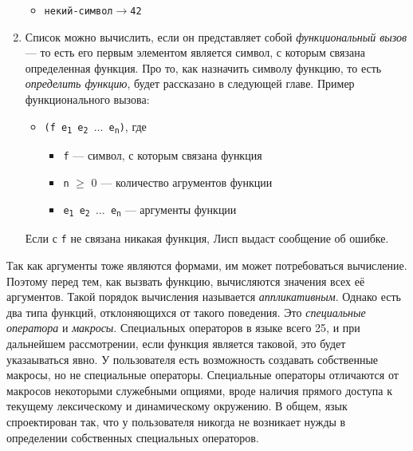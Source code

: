 \documentclass[a4paper, 12pt, titlepage, twoside]{article}
\begin{document}
\begin{enumerate}
\begin{itemize}
  \item[] \begin{alltt} некий-символ \(\longrightarrow\) 42\end{alltt}
  \end{itemize}
\item Список можно вычислить, если он представляет собой \textit{функциональный вызов} --- то есть его первым элементом является символ, с которым связана определенная функция. Про то, как назначить символу функцию, то есть \textit{определить функцию}, будет рассказано в следующей главе. Пример функционального вызова:
  \begin{itemize}
  \item[] \texttt{(f e\textsubscript{1} e\textsubscript{2} $\ldots$ e\textsubscript{n})}, где
    \begin{itemize}
    \item[] \verb|f| --- символ, с которым связана функция
    \item[] \verb|n| $\ge$ 0 --- количество агрументов функции
    \item[] \texttt{e\textsubscript{1} e\textsubscript{2} $\ldots$ e\textsubscript{n}} --- аргументы функции
    \end{itemize}
  \end{itemize}
  Если с \texttt{f} не связана никакая функция, Лисп выдаст сообщение об ошибке.
\end{enumerate}
Так как аргументы тоже являются формами, им может потребоваться вычисление. Поэтому перед тем, как вызвать функцию, вычисляются значения всех её аргументов. Такой порядок вычисления называется \textit{аппликативным}. Однако есть два типа функций, отклоняющихся от такого поведения. Это \textit{специальные оператора} и \textit{макросы}. Специальных операторов в языке всего 25, и при дальнейшем рассмотрении, если функция является таковой, это будет указаываться явно. У пользователя есть возможность создавать собственные макросы, но не специальные операторы. Специальные операторы отличаются от макросов некоторыми служебными опциями, вроде наличия прямого доступа к текущему лексическому и динамическому окружению. В общем, язык спроектирован так, что у пользователя никогда не возникает нужды в определении собственных специальных операторов.
\end{document}
